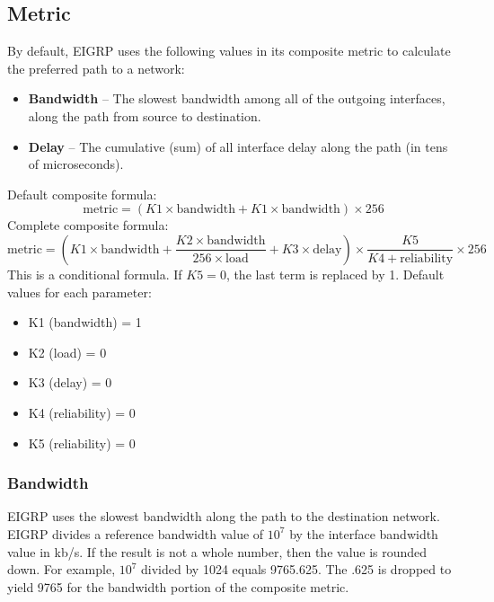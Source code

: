 \subsection{Metric}
By default, EIGRP uses the following values in its composite metric to calculate the preferred path to a network:
\begin{itemize}
\item \textbf{Bandwidth} -- The slowest bandwidth among all of the outgoing interfaces, along the path from source to destination.
\item \textbf{Delay} -- The cumulative (sum) of all interface delay along the path (in tens of microseconds).
\end{itemize}
Default composite formula:
\[ \text{metric} = \left( K1\times\text{bandwidth} + K1\times\text{bandwidth} \right) \times 256 \]
Complete composite formula:
\[ \text{metric} = \left( K1\times\text{bandwidth} + \frac{K2\times\text{bandwidth}}{256\times\text{load}} + K3\times\text{delay} \right) \times \frac{K5}{K4+\text{reliability}} \times 256 \]
This is a conditional formula. If $K5=0$, the last term is replaced by 1. Default values for each parameter:
\begin{itemize}
\item K1 (bandwidth) = 1
\item K2 (load) = 0
\item K3 (delay) = 0
\item K4 (reliability) = 0
\item K5 (reliability) = 0
\end{itemize}
\subsubsection{Bandwidth}
EIGRP uses the slowest bandwidth along the path to the destination network. EIGRP divides a reference bandwidth value of $10^7$ by the interface bandwidth value in kb/s. If the result is not a whole number, then the value is rounded down. For example, $10^7$ divided by 1024 equals 9765.625. The .625 is dropped to yield 9765 for the bandwidth portion of the composite metric.
